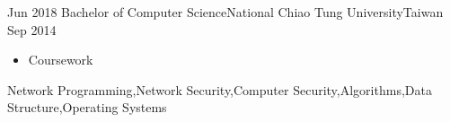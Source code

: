 \begin{experiences}
  \experience
    {Jun 2018}      {Bachelor of Computer Science}{National Chiao Tung University}{Taiwan}
    {Sep 2014}      {
                      \begin{itemize}
                        \item{Coursework}
                      \end{itemize}
                    }
                    {Network Programming,Network Security,Computer Security,Algorithms,Data Structure,Operating Systems}
\end{experiences}
